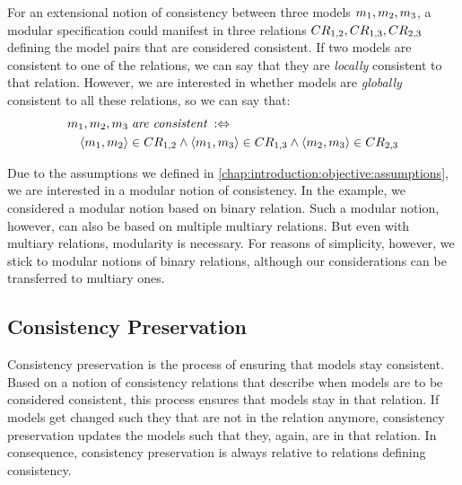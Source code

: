For an extensional notion of consistency between three models $m_{1}, m_{2}, m_{3}$, a modular specification could manifest in three relations $CR_{1,2}, CR_{1,3}, CR_{2,3}$ defining the model pairs that are considered consistent.
If two models are consistent to one of the relations, we can say that they are \emph{locally} consistent to that relation.
However, we are interested in whether models are \emph{globally} consistent to all these relations, so we can say that:
\begin{align*}
    & m_{1}, m_{2}, m_{3} \; \textit{are consistent} \; :\Leftrightarrow \\
    & \hspace{1em} 
    \langle m_{1},m_{2} \rangle \in CR_{1,2} \land \langle m_{1},m_{3} \rangle \in CR_{1,3} \land \langle m_{2},m_{3} \rangle \in CR_{2,3}
\end{align*}

Due to the assumptions we defined in \autoref{chap:introduction:objective:assumptions}, we are interested in a modular notion of consistency.
In the example, we considered a modular notion based on binary relation. Such a modular notion, however, can also be based on multiple multiary relations. 
But even with multiary relations, modularity is necessary.
For reasons of simplicity, however, we stick to modular notions of binary relations, although our considerations can be transferred to multiary ones.


\subsection{Consistency Preservation}

Consistency preservation is the process of ensuring that models stay consistent.
Based on a notion of consistency relations that describe when models are to be considered consistent, this process ensures that models stay in that relation. 
If models get changed such they that are not in the relation anymore, consistency preservation updates the models such that they, again, are in that relation.
In consequence, consistency preservation is always relative to relations defining consistency.

